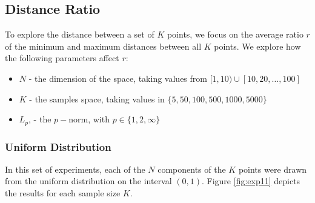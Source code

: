 \documentclass{article}
\begin{document}
\subsection{Distance Ratio}
To explore the distance between a set of $K$ points, we focus on the average ratio $r$ of the minimum and maximum distances between all $K$ points. We explore how the following parameters affect $r$:
\begin{itemize}
\item $N$ - the dimension of the space, taking values from $[1,10)\cup[10,20,\ldots,100]$
\item $K$ - the samples space, taking values in $\{5,50,100,500,1000,5000\}$
\item $L_p$, - the $p-$norm, with $p\in\{1,2,\infty\}$
\end{itemize}
\subsubsection{Uniform Distribution}
In this set of experiments, each of the $N$ components of the $K$ points were drawn from the uniform distribution on the interval $(0,1)$. Figure \ref{fig:exp11} depicts the results for each sample size $K$.
\end{document}
